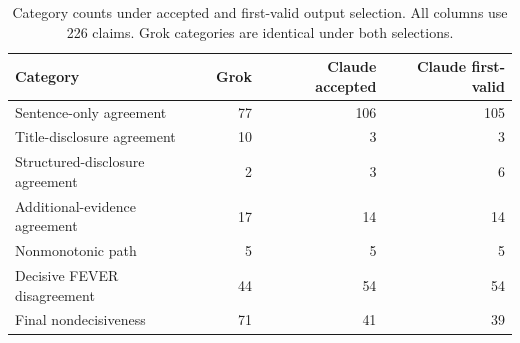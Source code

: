 \begin{table}[H]\centering\small
\caption{Category counts under accepted and first-valid output selection. All columns use 226 claims. Grok categories are identical under both selections.}\label{tab:sensitivity}
\begin{tabularx}{\linewidth}{Xrrr}\toprule
Category & Grok & Claude accepted & Claude first-valid \\\midrule
Sentence-only agreement & 77 & 106 & 105 \\
Title-disclosure agreement & 10 & 3 & 3 \\
Structured-disclosure agreement & 2 & 3 & 6 \\
Additional-evidence agreement & 17 & 14 & 14 \\
Nonmonotonic path & 5 & 5 & 5 \\
Decisive FEVER disagreement & 44 & 54 & 54 \\
Final nondecisiveness & 71 & 41 & 39 \\
\bottomrule
\end{tabularx}
\end{table}
